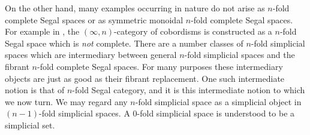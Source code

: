 \documentclass{amsart}
\begin{document}
On the other hand, many examples occurring { in nature} do not arise as $n$-fold complete Segal spaces or as symmetric monoidal $n$-fold complete Segal spaces. For example in \cite{Lurie}, the $(\infty, n)$-category of cobordisms is constructed as a $n$-fold Segal space which is {\em not} complete. There are a number classes of $n$-fold simplicial spaces which are intermediary between general $n$-fold simplicial spaces and the fibrant $n$-fold complete Segal spaces. For many purposes these intermediary objects are just as good as their fibrant replacement. One such intermediate notion is that of $n$-fold Segal category, and it is this intermediate notion to which we now turn. 
%
We may regard any $n$-fold simplicial space as a simplicial object in $(n-1)$-fold simplicial spaces. A $0$-fold simplicial space is understood to be a simplicial set. 
\end{document}

